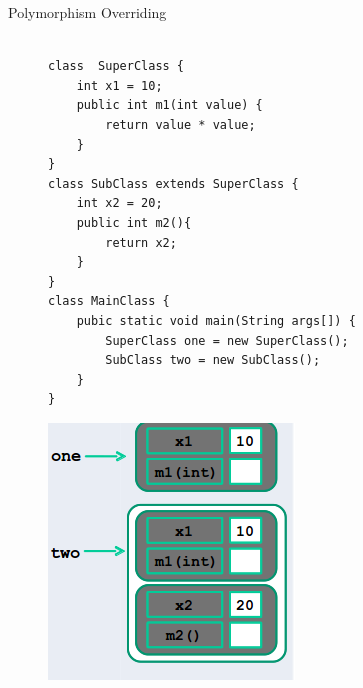 \documentclass[14pt]{beamer}
\begin{document}
\begin{frame}[fragile]{Polymorphism}
 Overriding
 
 \begin{figure}[H]
\begin{minipage}[l]{0.5\linewidth}
\begin{lstlisting}[numbers=none, basicstyle=\tiny, linebackgroundcolor={\ifnum\value{lstnumber}=3\color{green}\fi}]

class  SuperClass {
    int x1 = 10;
    public int m1(int value) {
        return value * value;
    }
}
class SubClass extends SuperClass {
    int x2 = 20;
    public int m2(){
        return x2;
    }
}
class MainClass {
    pubic static void main(String args[]) {
        SuperClass one = new SuperClass();
        SubClass two = new SubClass();
    }
}
\end{lstlisting}

\end{minipage}
\quad
\begin{minipage}[c]{0.3\textwidth}
\includegraphics[scale=.4]{poly-override.png}

\end{minipage}
\end{figure}
\end{frame}
\end{document}
